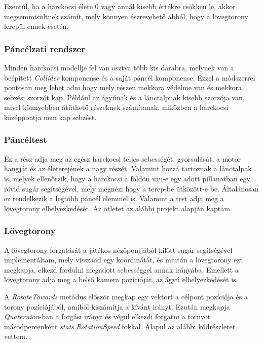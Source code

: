 \documentclass[
]{thesis-ekf}
\theoremstyle{definition}
\theoremstyle{remark}
\begin{document}
Ezentúl, ha a harckocsi élete 0 vagy annál kisebb értékre csökken le, akkor megsemmisültnek számít, mely könnyen észrevehető abból, hogy a lövegtorony lerepül ennek esetén.


\subsubsection{Páncélzati rendszer}
Minden harckocsi modellje fel van osztva több kis darabra, melynek van a beépített \emph{Collider} komponense és a saját páncél komponense. Ezzel a módszerrel pontosan meg lehet adni hogy mely részen mekkora védelme van és mekkora sebzési szorzót kap. Például az ágyúnak és a lánctalpnak kisebb szorzója van, mivel könnyebben átüthető részeknek számítanak, miközben a harckocsi középpontja nem kap sebzést.

\subsubsection{Páncéltest}

Ez a rész adja meg az egész harckocsi teljes sebességét, gyorsulását, a motor hangját és az életerejének a nagy részét. Valamint hozzá tartoznak a lánctalpak is, melyek ellenőrzik, hogy a harckocsi a földön van-e egy adott pillanatban egy rövid sugár segítségével, mely megnézi hogy a terep-be ütközött-e be.  Általánosan ez rendelkezik a legtöbb páncél elemmel is. Valamint a test adja meg a lövegtorony elhelyezkedését. Az ötletet az alábbi projekt alapján kaptam.

\subsubsection{Lövegtorony}

A lövegtorony forgatását a játékos nézőpontjából kilőtt sugár segítségével implementáltam, mely visszaad egy koordinátát, és miután a lövegtorony ezt megkapja, elkezd fordulni megadott sebességgel annak irányába. Emellett a lövegtorony adja meg a belső kamera pozícióját, az ágyú elhelyezkedését is.



A \emph{RotateTowards} metódus először megkap egy vektort a célpont pozíciója és a torony pozíciójából, amiből kiszámítja a kívánt irányt. Ezután megkapja \emph{Quaternion}-ban a forgási irányt és végül elkezdi forgatni a tornyot másodpercenként \emph{stats.RotationSpeed} fokkal. Alapul az alábbi kódrészletet\cite{rotation} vettem.
\end{document}
